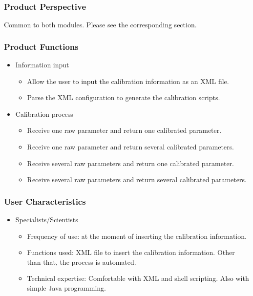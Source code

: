 \subsubsection{Product Perspective}

Common to both modules. Please see the corresponding section.

\subsubsection{Product Functions}

\begin{itemize}
\item Information input
\begin{itemize}
\item Allow the user to input the calibration information as an XML file.
\item Parse the XML configuration to generate the calibration scripts.
\end{itemize}
\item Calibration process
\begin{itemize}
\item Receive one raw parameter and return one calibrated parameter.
\item Receive one raw parameter and return several calibrated parameters.
\item Receive several raw parameters and return one calibrated parameter.
\item Receive several raw parameters and return several calibrated parameters.
\end{itemize}

\end{itemize}

\subsubsection{User Characteristics}

\begin{itemize}
\item Specialists/Scientists
\begin{itemize}
\item Frequency of use: at the moment of inserting the calibration information.
\item Functions used: XML file to insert the calibration information. Other than that, the process is automated.
\item Technical expertise: Comfortable with XML and shell scripting. Also with simple Java programming.
\end{itemize}
\end{itemize}


